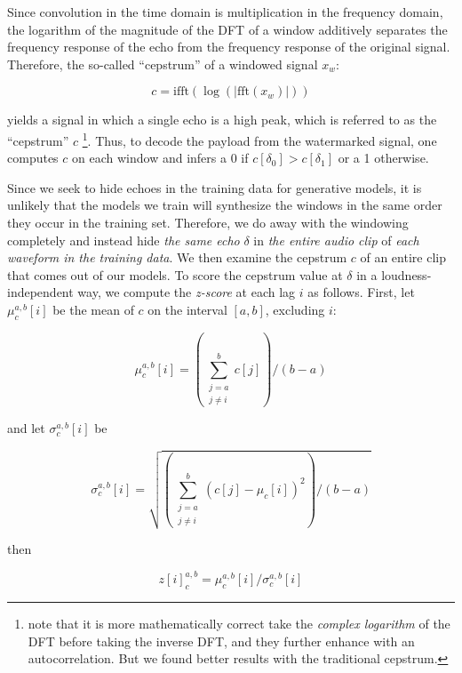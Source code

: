 \documentclass[letterpaper]{article} %
\begin{document}
 
Since convolution in the time domain is multiplication in the frequency domain, the logarithm of the magnitude of the DFT of a window additively separates the frequency response of the echo from the frequency response of the original signal.  Therefore, the so-called ``cepstrum'' of a windowed signal $x_w$:
 
\begin{equation}
    \label{eq:cepstrum}
    c = \text{ifft} ( \log ( | \text{fft} (x_w) | ) )
\end{equation}
 
yields a signal in which a single echo is a high peak, which is referred to as the ``cepstrum'' $c$ \footnote{\cite{gruhl1996echo} note that it is more mathematically correct take the {\em complex logarithm} of the DFT before taking the inverse DFT, and they further enhance with an autocorrelation.  But we found better results with the traditional cepstrum.}.  Thus, to decode the payload from the watermarked signal, one computes $c$ on each window and infers a 0 if $c[\delta_0] > c[\delta_1]$ or a 1 otherwise.

Since we seek to hide echoes in the training data for generative models, it is unlikely that the models we train will synthesize the windows in the same order they occur in the training set.  Therefore, we do away with the windowing completely and instead hide {\em the same echo} $\delta$ in {\em the entire audio clip} of {\em each waveform in the training data}.  We then examine the cepstrum $c$ of an entire clip that comes out of our models.  To score the cepstrum value at $\delta$ in a loudness-independent way, we compute the {\em z-score} at each lag $i$ as follows.  First, let $\mu_{c}^{a,b}[i]$ be the mean of $c$ on the interval $[a, b]$, excluding $i$:

\begin{equation}
    \mu_{c}^{a,b}[i] = \left( \sum_{\substack{j=a \\ j \neq i}}^{b} c[j] \right) / (b-a)
\end{equation}

and let $\sigma_{c}^{a,b}[i]$ be 

\begin{equation}
    \sigma_{c}^{a,b}[i] = \sqrt{ \left( \sum_{\substack{j=a \\ j \neq i}}^{b} (c[j] - \mu_c[i])^2 \right) / (b-a)}
\end{equation}

then

\begin{equation}
    \label{eq:zscore}
    z[i]_{c}^{a,b} = \mu_{c}^{a,b}[i] / \sigma_{c}^{a,b}[i]
\end{equation}
\end{document}
